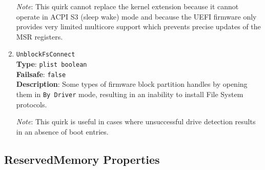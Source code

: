 \documentclass[]{article}
\begin{document}
\begin{enumerate}
  \emph{Note}: This quirk cannot replace the kernel extension because it cannot operate in
  ACPI S3 (sleep wake) mode and because the UEFI firmware only provides very limited
  multicore support which prevents precise updates of the MSR registers.

\item
  \texttt{UnblockFsConnect}\\
  \textbf{Type}: \texttt{plist\ boolean}\\
  \textbf{Failsafe}: \texttt{false}\\
  \textbf{Description}: Some types of firmware block partition handles by opening them
  in \texttt{By\ Driver} mode, resulting in an inability to install File System protocols.

  \emph{Note}: This quirk is useful in cases where unsuccessful drive detection
  results in an absence of boot entries.

\end{enumerate}

\subsection{ReservedMemory Properties}\label{uefirsvdprops}
\end{document}
